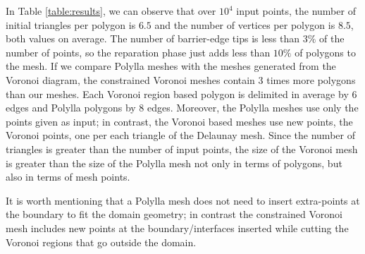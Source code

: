 \documentclass[lineno,pdflatex,sn-mathphys]{sn-jnl}%
\theoremstyle{thmstyleone}%
\theoremstyle{thmstyletwo}%
\theoremstyle{thmstylethree}%
\begin{document}
In Table \ref{table:results}, we can observe that over $10^4$ input points, the number of initial triangles per polygon is $6.5$ and the number of vertices per polygon is $8.5$, both values  on average. The number of barrier-edge tips is less than $3\%$ of the number of points, so the reparation phase just adds less than $10\%$ of polygons to the mesh. If we compare Polylla meshes with the meshes generated from the Voronoi diagram, the constrained  Voronoi meshes contain 3 times more polygons than our meshes. Each Voronoi region based polygon is delimited  in average by  6 edges and  Polylla polygons by 8 edges. 
Moreover, the Polylla meshes use only the points given as input; in contrast, the Voronoi based meshes use new points, the Voronoi points, one per each triangle of the Delaunay mesh. Since the number of triangles is greater than the number of input points, the size of the Voronoi mesh is greater than the size of the Polylla  mesh not only in terms of polygons, but also in terms of mesh points.%

It is worth mentioning that a Polylla mesh does not need to insert extra-points at the boundary to fit the domain geometry; in contrast the constrained  Voronoi mesh includes new points at the boundary/interfaces inserted while cutting the Voronoi regions that go outside the domain.  
\end{document}
